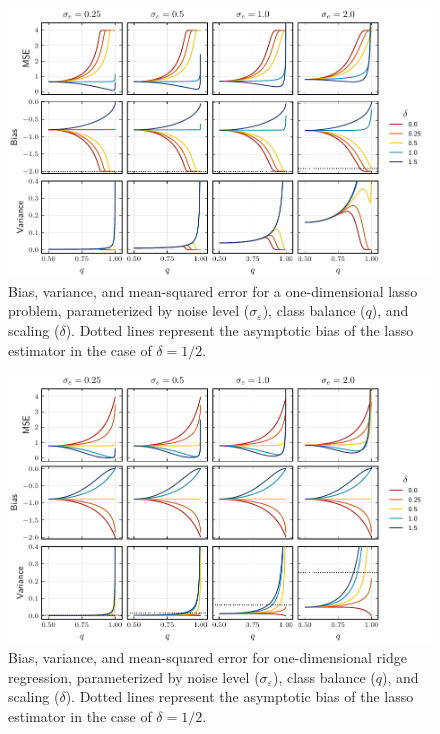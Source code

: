 \begin{figure}[htpb]
  \centering
  \includegraphics[]{plots/binary_onedim_bias_var_lasso.pdf}
  \caption{%
    Bias, variance, and mean-squared error for a one-dimensional lasso problem,
    parameterized by noise level (\(\sigma_\varepsilon\)), class balance (\(q\)), and
    scaling (\(\delta\)). Dotted lines represent the asymptotic bias of the lasso
    estimator in the case of \(\delta = 1/2\). } \label{fig:bias-var-onedim-lasso}
\end{figure}

\begin{figure}[htpb]
  \centering
  \includegraphics[]{plots/binary_onedim_bias_var_ridge.pdf}
  \caption{%
    Bias, variance, and mean-squared error for one-dimensional ridge regression,
    parameterized by noise level (\(\sigma_\varepsilon\)), class balance (\(q\)), and
    scaling (\(\delta\)). Dotted lines represent the asymptotic bias of the lasso
    estimator in the case of \(\delta = 1/2\). } \label{fig:bias-var-onedim-ridge}
\end{figure}

